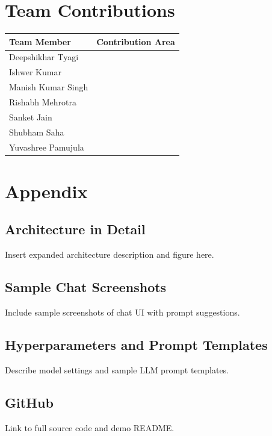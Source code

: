 \documentclass{ecai}
\begin{document}
\section*{Team Contributions}
\begin{table}[h]
  \centering
  \begin{tabular}{|l|l|}
    \hline
    \textbf{Team Member} & \textbf{Contribution Area} \\
    \hline
    Deepshikhar Tyagi &    \\
    Ishwer Kumar &    \\
    Manish Kumar Singh &    \\
    Rishabh Mehrotra &    \\
    Sanket Jain &    \\
    Shubham Saha &    \\
    Yuvashree Pamujula &    \\
    \hline
  \end{tabular}
\end{table}

\appendix
\section*{Appendix}
\subsection*{Architecture in Detail}
Insert expanded architecture description and figure here.

\subsection*{Sample Chat Screenshots}
Include sample screenshots of chat UI with prompt suggestions.

\subsection*{Hyperparameters and Prompt Templates}
Describe model settings and sample LLM prompt templates.

\subsection*{GitHub}
Link to full source code and demo README.
\end{document}
